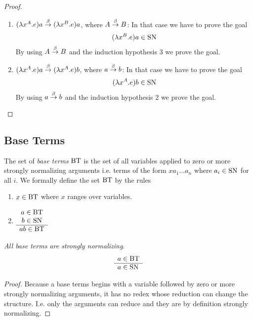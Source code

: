 \begin{theorem}
\begin{proof}
\begin{enumerate}
        \item $(\lambda x^A.e)a \stackrel{\beta}{\to} (\lambda x^B.e)a$, where $A \stackrel{\beta}{\to} B$:
            In that case we have to prove the goal
            $$
                (\lambda x^B.e)a \in \text{SN}
            $$
            By using $A \stackrel{\beta}{\to} B$ and the induction hypothesis 3 we prove the
            goal.

        \item $(\lambda x^A.e)a \stackrel{\beta}{\to} (\lambda x^A.e)b$, where $a \stackrel{\beta}{\to}
            b$: In that case we have to prove the goal
            $$
                (\lambda x^A.e)b \in \text{SN}
            $$
            By using $a \stackrel{\beta}{\to} b$ and the induction hypothesis 2 we prove the
            goal.
        \end{enumerate}
    \end{proof}
\end{theorem}









\subsection{Base Terms}



\begin{definition}
    The set of \emph{base terms} $\text{BT}$ is the set of all variables applied to
    zero or more strongly normalizing arguments i.e. terms of the form $x a_1
    \ldots a_n$ where $a_i \in \text{SN}$ for all $i$. We formally define the set
    $\text{BT}$ by the rules
    \begin{enumerate}
    \item $x \in \text{BT}$ where $x$ ranges over variables.

    \item
        $\begin{array}{c} 
            a \in \text{BT}
            \\
            b \in \text{SN}
         \\ \hline 
            ab \in \text{BT}
        \end{array}$
    \end{enumerate}
\end{definition}

\begin{theorem}
    \label{BaseTermsStronglyNormalizing}
    \emph{All base terms are strongly normalizing}.
    $$
    \begin{array}{l} 
        a \in \text{BT}
     \\ \hline 
        a \in \text{SN}
    \end{array}
    $$
    \begin{proof}
        Because a base terms begins with a variable followed by zero or more
        strongly normalizing arguments, it has no redex whose reduction can
        change the structure. I.e. only the arguments can reduce and they are by
        definition strongly normalizing.
    \end{proof}
\end{theorem}






